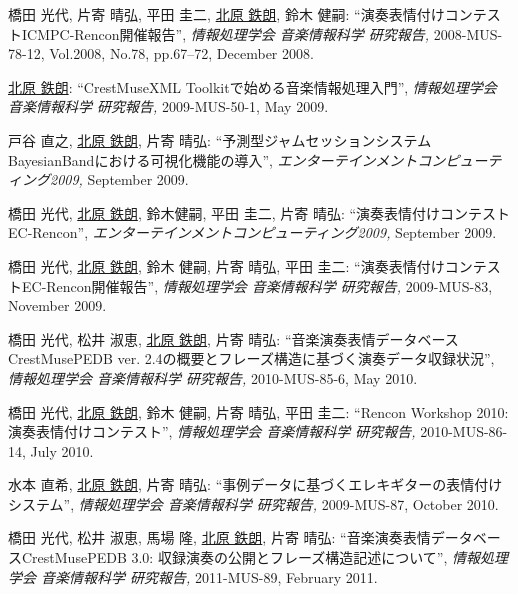 \begin{Enumerate}
\item 
橋田 光代, 
片寄 晴弘, 
平田 圭二, 
\underline{北原 鉄朗}, 
鈴木 健嗣: 
    ``演奏表情付けコンテストICMPC-Rencon開催報告'', 
    {\it 情報処理学会 音楽情報科学 研究報告,} 2008-MUS-78-12, Vol.2008, No.78, pp.67--72, December 2008. 

\item 
\underline{北原 鉄朗}: 
    ``CrestMuseXML Toolkitで始める音楽情報処理入門'', 
    {\it 情報処理学会 音楽情報科学 研究報告,
    } 2009-MUS-50-1, May 2009. 

\item 
戸谷 直之, 
\underline{北原 鉄朗}, 
片寄 晴弘: 
    ``予測型ジャムセッションシステムBayesianBandにおける可視化機能の導入'', 
    {\it エンターテインメントコンピューティング2009,
    } September 2009. 

\item 
橋田 光代, 
\underline{北原 鉄朗}, 
鈴木健嗣, 
平田 圭二, 
片寄 晴弘: 
    ``演奏表情付けコンテストEC-Rencon'', 
    {\it エンターテインメントコンピューティング2009,
    } September 2009. 

\item 
橋田 光代, 
\underline{北原 鉄朗}, 
鈴木 健嗣, 
片寄 晴弘, 
平田 圭二: 
    ``演奏表情付けコンテストEC-Rencon開催報告'', 
    {\it 情報処理学会 音楽情報科学 研究報告,
    } 2009-MUS-83, November 2009. 

\item 
橋田 光代, 
松井 淑恵, 
\underline{北原 鉄朗}, 
片寄 晴弘: 
    ``音楽演奏表情データベースCrestMusePEDB ver. 2.4の概要とフレーズ構造に基づく演奏データ収録状況'', 
    {\it 情報処理学会 音楽情報科学 研究報告,
    } 2010-MUS-85-6, May 2010. 

\item 
橋田 光代, 
\underline{北原 鉄朗}, 
鈴木 健嗣, 
片寄 晴弘, 
平田 圭二: 
    ``Rencon Workshop 2010: 演奏表情付けコンテスト'', 
    {\it 情報処理学会 音楽情報科学 研究報告,
    } 2010-MUS-86-14, July 2010. 

\item 
水本 直希, 
\underline{北原 鉄朗}, 
片寄 晴弘: 
    ``事例データに基づくエレキギターの表情付けシステム'', 
    {\it 情報処理学会 音楽情報科学 研究報告,
    } 2009-MUS-87, October 2010. 

\item 
橋田 光代, 
松井 淑恵, 
馬場 隆, 
\underline{北原 鉄朗}, 
片寄 晴弘: 
    ``音楽演奏表情データベースCrestMusePEDB 3.0: 収録演奏の公開とフレーズ構造記述について'', 
    {\it 情報処理学会 音楽情報科学 研究報告,
    } 2011-MUS-89, February 2011. 


\end{Enumerate}
